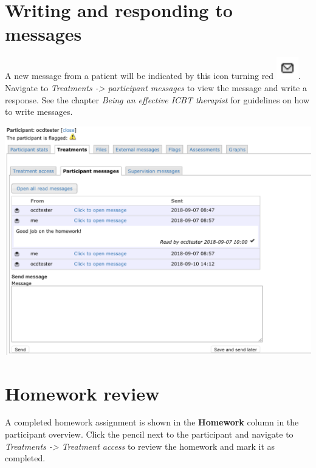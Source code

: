 \documentclass[]{book}
\theoremstyle{definition}
\theoremstyle{definition}
\theoremstyle{definition}
\theoremstyle{remark}
\begin{document}
\hypertarget{writing-and-responding-to-messages}{%
\section{Writing and responding to
messages}\label{writing-and-responding-to-messages}}

A new message from a patient will be indicated by this icon turning red
\includegraphics{images/message-icon.png}. Navigate to \emph{Treatments
-\textgreater{} participant messages} to view the message and write a
response. See the chapter \emph{Being an effective ICBT therapist} for
guidelines on how to write messages.

\includegraphics{images/therapist-messages.png}

\hypertarget{homework-review}{%
\section{Homework review}\label{homework-review}}

A completed homework assignment is shown in the \textbf{Homework} column
in the participant overview. Click the pencil next to the participant
and navigate to \emph{Treatments -\textgreater{} Treatment access} to
review the homework and mark it as completed.
\end{document}
